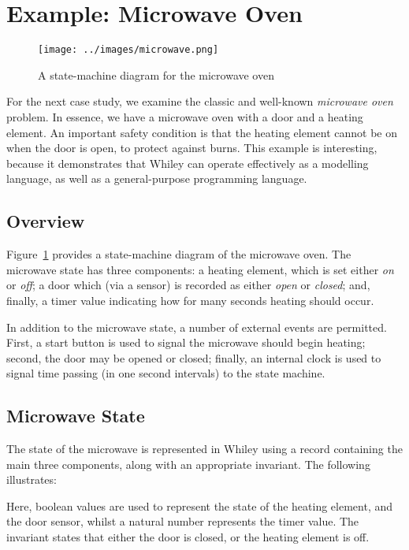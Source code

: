 \newpage
\section{Example: Microwave Oven}
\label{microwave}
\begin{figure}[!t]
\centering
\texttt{[image: ../images/microwave.png]}
\caption{A state-machine diagram for the microwave oven}
\label{fig_microwave}
\end{figure}

For the next case study, we examine the classic and well-known {\em
  microwave oven} problem.  In essence, we have a microwave oven with
a door and a heating element.  An important safety condition is that
the heating element cannot be on when the door is open, to protect
against burns.  This example is interesting, because it demonstrates
that Whiley can operate effectively as a modelling language, as well
as a general-purpose programming language.

\subsection{Overview}
Figure~\ref{fig_microwave} provides a state-machine diagram of the
microwave oven.  The microwave state has three components: a heating
element, which is set either {\em on} or {\em off}; a door which (via
a sensor) is recorded as either {\em open} or {\em closed}; and, finally, a timer value indicating how for many seconds heating should occur.

In addition to the microwave state, a number of external events are permitted.  First, a start button is used to signal the microwave should begin heating; second, the door may be opened or closed; finally, an internal clock is used to signal time passing (in one second intervals) to the state machine.

\subsection{Microwave State}
The state of the microwave is represented in Whiley using a record containing the main three components, along with an appropriate invariant.  The following illustrates:



Here, boolean values are used to represent the state of the heating element, and the door sensor, whilst a natural number represents the timer value.  The invariant states that either the door is closed, or the heating element is off.

